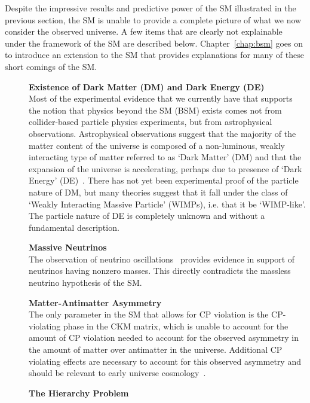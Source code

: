 Despite the impressive results and predictive power of the SM illustrated in the previous
section, the SM is unable to provide a complete picture of what we now consider the observed
universe.
A few items that are clearly not explainable under the framework of the SM are described below.
Chapter~\ref{chap:bsm} goes on to introduce an extension to the SM that provides explanations
for many of these short comings of the SM.

\begin{description}
    \item[] \textbf{Existence of Dark Matter (DM) and Dark Energy (DE)} \\
        Most of the experimental evidence that we currently have that supports the notion that
        physics beyond the SM (BSM) exists comes not from collider-based particle physics experiments,
        but from astrophysical observations.
        Astrophysical observations suggest that the majority of the matter content of the universe
        is composed of a non-luminous, weakly interacting type of matter referred to as `Dark Matter' (DM)
        and that the expansion of the universe is accelerating, perhaps due to presence of
        `Dark Energy' (DE)~\cite{Davis:2014csa,PlanckCollab}.
        There has not yet been experimental proof of the particle nature of DM, but
        many theories suggest that it fall under the class of `Weakly Interacting Massive Particle' (WIMPs), i.e. that it be `WIMP-like'.
        The particle nature of DE is completely unknown and without a fundamental description.
    \item[] \textbf{Massive Neutrinos} \\ The observation of neutrino oscillations~\cite{Fukuda:1998mi} provides evidence
        in support of neutrinos having nonzero masses. This directly contradicts the massless neutrino hypothesis of the SM.
    \item[] \textbf{Matter-Antimatter Asymmetry} \\
        The only parameter in the SM that allows for CP violation is the CP-violating phase in the CKM matrix,
        which is unable to account for the amount of CP violation needed to account for the
        observed asymmetry in the amount of matter over antimatter in the universe.
        Additional CP violating effects are necessary to account for this observed asymmetry and should be relevant
        to early universe cosmology~\cite{Sakharov_1991}.
    \item[] \textbf{The Hierarchy Problem} \\

\end{description}
